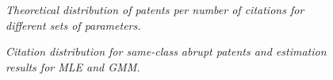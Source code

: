 \documentclass[letterpaper,12pt]{article}
\theoremstyle{definition}
\begin{document}
\begin{figure}[htb]\centering \captionsetup{width=5.8in}
    \caption{\label{fig:ImpactPar}\textit{Theoretical distribution of patents per number of citations for different sets of parameters.}}
\end{figure}

\begin{figure}[htb]\centering \captionsetup{width=5.8in}
    \caption{\label{fig:GMM_MLE}\textit{Citation distribution for same-class abrupt patents and estimation results for MLE and GMM.}}
\end{figure}
\end{document}
